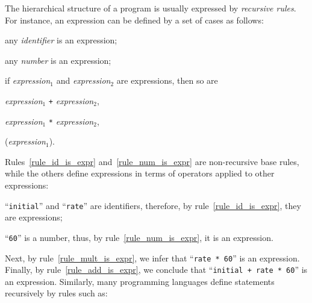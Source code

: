 \documentclass[12pt,a4paper]{article}
\begin{document}
The hierarchical structure of a program is usually expressed by
\emph{recursive rules}. For instance, an expression can be defined by
a set of cases as follows:
\begin{enumerate*}

  \item any \emph{identifier} is an expression;\label{rule_id_is_expr}

  \item any \emph{number} is an expression;\label{rule_num_is_expr}

  \item if \emph{expression}\(_1\) and \emph{expression}\(_2\) are
  expressions, then so are
   \begin{enumerate*}

     \item \emph{expression}\(_1\) \verb|+|
       \emph{expression}\(_2\), \label{rule_add_is_expr}

     \item \emph{expression}\(_1\) \verb|*|
       \emph{expression}\(_2\), \label{rule_mult_is_expr}

     \item (\emph{expression\(_1\)}).

   \end{enumerate*}

\end{enumerate*}
Rules~\ref{rule_id_is_expr} and~\ref{rule_num_is_expr} are
non-recursive base rules, while the others define expressions in terms
of operators applied to other expressions:
\begin{itemize*}

  \item ``\texttt{initial}'' and ``\texttt{rate}'' are identifiers,
    therefore, by rule~\ref{rule_id_is_expr}, they are expressions;

  \item ``\texttt{60}'' is a number, thus, by
    rule~\ref{rule_num_is_expr}, it is an expression.

\end{itemize*}
Next, by rule~\ref{rule_mult_is_expr}, we infer that ``\texttt{rate *
  60}'' is an expression. Finally, by rule~\ref{rule_add_is_expr}, we
conclude that ``\texttt{initial + rate * 60}'' is an
expression. Similarly, many programming languages define statements
recursively by rules such as:
\end{document}
